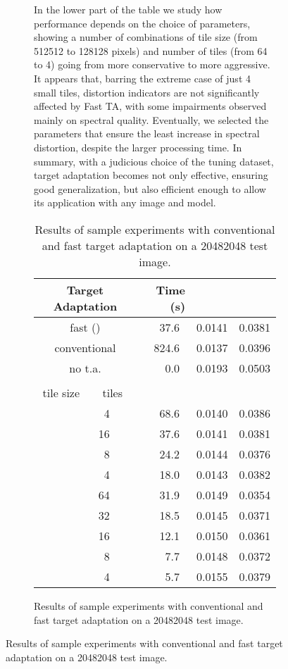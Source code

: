 \documentclass[journal]{IEEEtran}
\newcommand{\ru} {\rule{0mm}{3mm}}
\begin{document}
\begin{figure}
\begin{figure}
In the lower part of the table we study how performance depends on the choice of parameters,
showing a number of combinations of tile size (from 512512 to 128128 pixels) and number of tiles (from 64 to 4)
going from more conservative to more aggressive.
It appears that, barring the extreme case of just 4 small tiles,
distortion indicators are not significantly affected by Fast TA, with some impairments observed mainly on spectral quality.
Eventually, we selected the parameters that ensure the least increase in spectral distortion, despite the larger processing time.
In summary,
with a judicious choice of the tuning dataset, target adaptation becomes not only effective, ensuring good generalization,
but also efficient enough to allow its application with any image and model.



{\renewcommand{\ru}{\rule{0mm}{2.8mm}}
\begin{table}
\centering
\setlength{\tabcolsep}{6pt}
\begin{tabular}{cc|r|cc}
\multicolumn{2}{c|}{Target Adaptation}         &   \ru Time (s) &      &       \\ \hline
\multicolumn{2}{c|}{fast ()} &   \ru  37.6~   &   0.0141   &   0.0381   \\ \hline
\multicolumn{2}{c|}{conventional}              &   \ru 824.6~   &   0.0137   &   0.0396   \\ \hline
\multicolumn{2}{c|}{no t.a.}                   &   \ru   0.0~   &   0.0193   &   0.0503   \\ \hline \\
tile size                     &  tiles     &                &            &            \\ \hline
                &  4~~           &   \ru  68.6~   &   0.0140   &   0.0386   \\ \hline
                              & 16~~~          &   \ru  37.6~   &   0.0141   &   0.0381   \\
                &  8~~           &   \ru  24.2~   &   0.0144   &   0.0376   \\
                              &  4~~           &   \ru  18.0~   &   0.0143   &   0.0382   \\ \hline
                              & 64~~~          &   \ru  31.9~   &   0.0149   &   0.0354   \\
                              & 32~~~          &   \ru  18.5~   &   0.0145   &   0.0371   \\
                & 16~~~          &   \ru  12.1~   &   0.0150   &   0.0361   \\
                              &  8~~           &   \ru   7.7~   &   0.0148   &   0.0372   \\
                              &  4~~           &   \ru   5.7~   &   0.0155   &   0.0379   \\ \hline
\hline
\end{tabular}
\caption{Results of sample experiments with conventional and fast target adaptation on a 20482048 test image.}
\label{tab:fast_ta_metrics}
\end{table}
}



\end{figure}
\end{figure}
\end{document}
